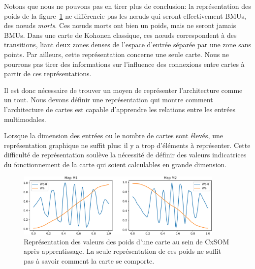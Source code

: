 Notons que nous ne pouvons pas en tirer plus de conclusion: la représentation des poids de la figure~\ref{fig:weights} ne différencie pas les n\oe{}uds qui seront effectivement BMUs, des n\oe{}uds \emph{morts}. Ces n\oe{}uds morts ont bien un poids, mais ne seront jamais BMUs. Dans une carte de Kohonen classique, ces n\oe{}uds correspondent à des transitions, liant deux zones denses de l'espace d'entrée séparée par une zone sans points.
Par ailleurs, cette représentation concerne une seule carte. Nous ne pourrons pas tirer des informations sur l'influence des connexions entre cartes à partir de ces représentations.

Il est donc nécessaire de trouver un moyen de représenter l'architecture comme un tout. Nous devons définir une représentation qui montre comment l'architecture de cartes est capable d'apprendre les relations entre les entrées multimodales.

Lorsque la dimension des entrées ou le nombre de cartes sont élevés, une représentation graphique ne suffit plus: il y a trop d'éléments à représenter. Cette difficulté de représentation soulève la nécessité de définir des valeurs indicatrices du fonctionnement de la carte qui soient calculables en grande dimension.


\begin{figure}
\centering
\includegraphics[width=0.9\textwidth]{weights_cercle1.pdf}

\caption{Représentation des valeurs des poids d'une carte au sein de CxSOM après apprentissage. La seule représentation de ces poids ne suffit pas à savoir comment la carte se comporte.\label{fig:weights}}
\end{figure}

